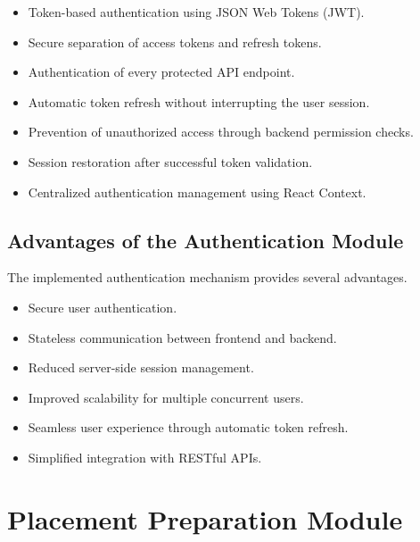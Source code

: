 \begin{itemize}

\item Token-based authentication using JSON Web Tokens (JWT).

\item Secure separation of access tokens and refresh tokens.

\item Authentication of every protected API endpoint.

\item Automatic token refresh without interrupting the user session.

\item Prevention of unauthorized access through backend permission checks.

\item Session restoration after successful token validation.

\item Centralized authentication management using React Context.

\end{itemize}

\subsection{Advantages of the Authentication Module}

The implemented authentication mechanism provides several advantages.

\begin{itemize}

\item Secure user authentication.

\item Stateless communication between frontend and backend.

\item Reduced server-side session management.

\item Improved scalability for multiple concurrent users.

\item Seamless user experience through automatic token refresh.

\item Simplified integration with RESTful APIs.

\end{itemize}

\section{Placement Preparation Module}

